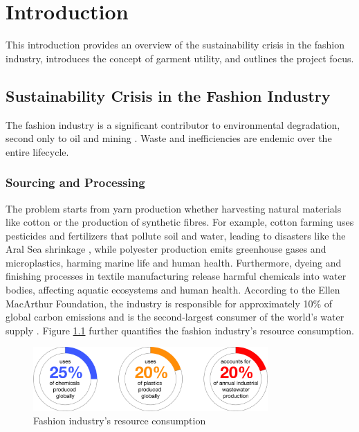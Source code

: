 \chapter{Introduction}

This introduction provides an overview of the sustainability crisis in the fashion industry, introduces the concept of garment utility, and outlines the project focus.

\section{Sustainability Crisis in the Fashion Industry}
The fashion industry is a significant contributor to environmental degradation, second only to oil and mining \cite{charter_accelerating_2024}. Waste and inefficiencies are endemic over the entire lifecycle. 
\subsection{Sourcing and Processing}
The problem starts from yarn production whether harvesting natural materials like cotton or the production of synthetic fibres. For example, cotton farming uses pesticides and fertilizers that pollute soil and water, leading to disasters like the Aral Sea shrinkage \cite{noauthor_aral_nodate}, while polyester production emits greenhouse gases and microplastics, harming marine life and human health. Furthermore, dyeing and finishing processes in textile manufacturing release harmful chemicals into water bodies, affecting aquatic ecosystems and human health. According to the Ellen MacArthur Foundation, the industry is responsible for approximately 10\% of global carbon emissions and is the second-largest consumer of the world's water supply \cite{ellen_macarthur_foundation_new_2017}. Figure \ref{fig:resource_consumption} further quantifies the fashion industry's resource consumption.
\begin{figure} [H]
    \centering
    \includegraphics[width=0.8\textwidth]{Images/sourcing donuts.png}
    \caption{Fashion industry's resource consumption \cite{charter_accelerating_2024}}
    \label{fig:resource_consumption}
\end{figure}
